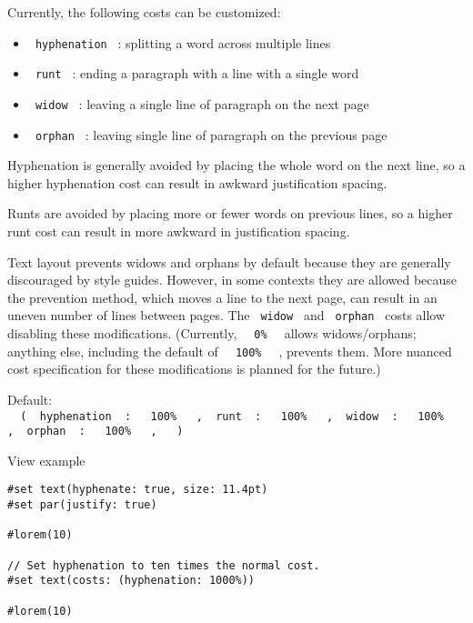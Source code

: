 Currently, the following costs can be customized:

\begin{itemize}
\tightlist
\item
  \texttt{\ hyphenation\ } : splitting a word across multiple lines
\item
  \texttt{\ runt\ } : ending a paragraph with a line with a single word
\item
  \texttt{\ widow\ } : leaving a single line of paragraph on the next
  page
\item
  \texttt{\ orphan\ } : leaving single line of paragraph on the previous
  page
\end{itemize}

Hyphenation is generally avoided by placing the whole word on the next
line, so a higher hyphenation cost can result in awkward justification
spacing.

Runts are avoided by placing more or fewer words on previous lines, so a
higher runt cost can result in more awkward in justification spacing.

Text layout prevents widows and orphans by default because they are
generally discouraged by style guides. However, in some contexts they
are allowed because the prevention method, which moves a line to the
next page, can result in an uneven number of lines between pages. The
\texttt{\ widow\ } and \texttt{\ orphan\ } costs allow disabling these
modifications. (Currently, \texttt{\ }{\texttt{\ 0\%\ }}\texttt{\ }
allows widows/orphans; anything else, including the default of
\texttt{\ }{\texttt{\ 100\%\ }}\texttt{\ } , prevents them. More nuanced
cost specification for these modifications is planned for the future.)

Default:
\texttt{\ }{\texttt{\ (\ }}\texttt{\ hyphenation\ }{\texttt{\ :\ }}\texttt{\ }{\texttt{\ 100\%\ }}\texttt{\ }{\texttt{\ ,\ }}\texttt{\ runt\ }{\texttt{\ :\ }}\texttt{\ }{\texttt{\ 100\%\ }}\texttt{\ }{\texttt{\ ,\ }}\texttt{\ widow\ }{\texttt{\ :\ }}\texttt{\ }{\texttt{\ 100\%\ }}\texttt{\ }{\texttt{\ ,\ }}\texttt{\ orphan\ }{\texttt{\ :\ }}\texttt{\ }{\texttt{\ 100\%\ }}\texttt{\ }{\texttt{\ ,\ }}\texttt{\ }{\texttt{\ )\ }}\texttt{\ }


View example

\begin{verbatim}
#set text(hyphenate: true, size: 11.4pt)
#set par(justify: true)

#lorem(10)

// Set hyphenation to ten times the normal cost.
#set text(costs: (hyphenation: 1000%))

#lorem(10)
\end{verbatim}

